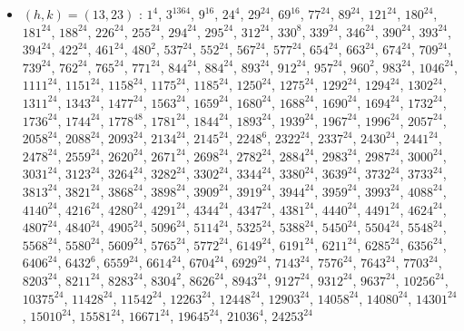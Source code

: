 \begin{itemize}
\item $(h,k)=(13,23)$ : $1^{4}$, $3^{1364}$, $9^{16}$, $24^{4}$, $29^{24}$, $69^{16}$, $77^{24}$, $89^{24}$, $121^{24}$, $180^{24}$, $181^{24}$, $188^{24}$, $226^{24}$, $255^{24}$, $294^{24}$, $295^{24}$, $312^{24}$, $330^{8}$, $339^{24}$, $346^{24}$, $390^{24}$, $393^{24}$, $394^{24}$, $422^{24}$, $461^{24}$, $480^{2}$, $537^{24}$, $552^{24}$, $567^{24}$, $577^{24}$, $654^{24}$, $663^{24}$, $674^{24}$, $709^{24}$, $739^{24}$, $762^{24}$, $765^{24}$, $771^{24}$, $844^{24}$, $884^{24}$, $893^{24}$, $912^{24}$, $957^{24}$, $960^{2}$, $983^{24}$, $1046^{24}$, $1111^{24}$, $1151^{24}$, $1158^{24}$, $1175^{24}$, $1185^{24}$, $1250^{24}$, $1275^{24}$, $1292^{24}$, $1294^{24}$, $1302^{24}$, $1311^{24}$, $1343^{24}$, $1477^{24}$, $1563^{24}$, $1659^{24}$, $1680^{24}$, $1688^{24}$, $1690^{24}$, $1694^{24}$, $1732^{24}$, $1736^{24}$, $1744^{24}$, $1778^{48}$, $1781^{24}$, $1844^{24}$, $1893^{24}$, $1939^{24}$, $1967^{24}$, $1996^{24}$, $2057^{24}$, $2058^{24}$, $2088^{24}$, $2093^{24}$, $2134^{24}$, $2145^{24}$, $2248^{6}$, $2322^{24}$, $2337^{24}$, $2430^{24}$, $2441^{24}$, $2478^{24}$, $2559^{24}$, $2620^{24}$, $2671^{24}$, $2698^{24}$, $2782^{24}$, $2884^{24}$, $2983^{24}$, $2987^{24}$, $3000^{24}$, $3031^{24}$, $3123^{24}$, $3264^{24}$, $3282^{24}$, $3302^{24}$, $3344^{24}$, $3380^{24}$, $3639^{24}$, $3732^{24}$, $3733^{24}$, $3813^{24}$, $3821^{24}$, $3868^{24}$, $3898^{24}$, $3909^{24}$, $3919^{24}$, $3944^{24}$, $3959^{24}$, $3993^{24}$, $4088^{24}$, $4140^{24}$, $4216^{24}$, $4280^{24}$, $4291^{24}$, $4344^{24}$, $4347^{24}$, $4381^{24}$, $4440^{24}$, $4491^{24}$, $4624^{24}$, $4807^{24}$, $4840^{24}$, $4905^{24}$, $5096^{24}$, $5114^{24}$, $5325^{24}$, $5388^{24}$, $5450^{24}$, $5504^{24}$, $5548^{24}$, $5568^{24}$, $5580^{24}$, $5609^{24}$, $5765^{24}$, $5772^{24}$, $6149^{24}$, $6191^{24}$, $6211^{24}$, $6285^{24}$, $6356^{24}$, $6406^{24}$, $6432^{6}$, $6559^{24}$, $6614^{24}$, $6704^{24}$, $6929^{24}$, $7143^{24}$, $7576^{24}$, $7643^{24}$, $7703^{24}$, $8203^{24}$, $8211^{24}$, $8283^{24}$, $8304^{2}$, $8626^{24}$, $8943^{24}$, $9127^{24}$, $9312^{24}$, $9637^{24}$, $10256^{24}$, $10375^{24}$, $11428^{24}$, $11542^{24}$, $12263^{24}$, $12448^{24}$, $12903^{24}$, $14058^{24}$, $14080^{24}$, $14301^{24}$, $15010^{24}$, $15581^{24}$, $16671^{24}$, $19645^{24}$, $21036^{4}$, $24253^{24}$

\end{itemize}
